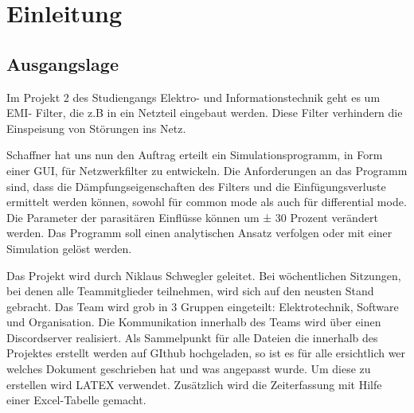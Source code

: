 \section{Einleitung}
\subsection{Ausgangslage}
Im Projekt 2 des Studiengangs Elektro- und Informationstechnik geht es um EMI- Filter, die z.B in ein Netzteil eingebaut werden. Diese Filter verhindern die Einspeisung von Störungen ins Netz.

Schaffner hat uns nun den Auftrag erteilt ein Simulationsprogramm, in Form einer GUI, für Netzwerkfilter zu entwickeln. Die Anforderungen an das Programm sind, dass die Dämpfungseigenschaften des Filters und die Einfügungsverluste ermittelt werden können, sowohl für common mode als auch für differential mode. Die Parameter der parasitären Einflüsse können um ± 30 Prozent verändert werden. Das Programm soll einen analytischen Ansatz verfolgen oder mit einer Simulation gelöst werden.
 
Das Projekt wird durch Niklaus Schwegler geleitet. Bei wöchentlichen Sitzungen, bei denen alle Teammitglieder teilnehmen, wird sich auf den neusten Stand gebracht. Das Team wird grob in 3 Gruppen eingeteilt: Elektrotechnik, Software und Organisation. Die Kommunikation innerhalb des Teams wird über einen Discordserver realisiert.  Als Sammelpunkt für alle Dateien die innerhalb des Projektes erstellt werden auf GIthub hochgeladen, so ist es für alle ersichtlich wer welches Dokument geschrieben hat und was angepasst wurde. Um diese zu erstellen wird LATEX verwendet. Zusätzlich wird die Zeiterfassung mit Hilfe einer Excel-Tabelle gemacht.   




 




